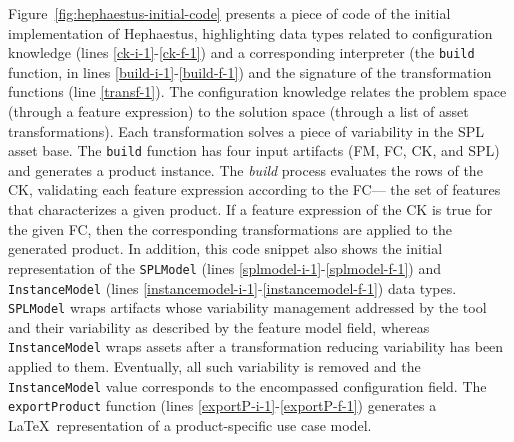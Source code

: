 Figure~\ref{fig:hephaestus-initial-code} presents a piece of code of the
initial implementation of Hephaestus, highlighting data types related to configuration knowledge
(lines \ref{ck-i-1}-\ref{ck-f-1})
and a corresponding interpreter (the \texttt{build} function, in lines \ref{build-i-1}-\ref{build-f-1}) and the signature of
the transformation functions (line \ref{transf-1}). The configuration knowledge relates the problem space (through a feature expression) to the solution space (through a list of asset transformations). Each transformation solves a piece of variability in the SPL asset base. The \texttt{build} function has four input
artifacts (FM, FC, CK, and SPL) and generates a product instance. The \textit{build} process evaluates the rows of the CK, validating each feature expression
according to the FC--- the set of features that characterizes a given product. If a feature expression of the CK is true for
the given FC, then the corresponding transformations are applied to the generated product.
In addition, this code snippet also shows the
initial representation of the \texttt{SPLModel} (lines \ref{splmodel-i-1}-\ref{splmodel-f-1}) and \texttt{InstanceModel}
(lines \ref{instancemodel-i-1}-\ref{instancemodel-f-1})
data types. \texttt{SPLModel} wraps artifacts whose variability management addressed by the tool and their variability as described by the feature model field, whereas \texttt{InstanceModel} wraps assets after a transformation reducing variability has been applied to them. Eventually, all such variability is removed and the \texttt{InstanceModel} value corresponds to the encompassed configuration field. The \texttt{exportProduct} function (lines \ref{exportP-i-1}-\ref{exportP-f-1}) generates a \LaTeX\ representation of a product-specific use case model.

